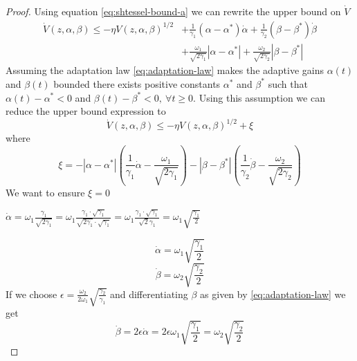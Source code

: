 \begin{proof}
        Using equation \eqref{eq:shtessel-bound-a} we can rewrite the upper bound on $\dot{V}$  
        \begin{equation}
          \begin{split}
            \dot{V}(z, \alpha, \beta) \leq -\eta V(z,\alpha,\beta)^{1/2} &+ \frac{1}{\gamma_1}\left(\alpha - \alpha^*\right)\dot{\alpha} + \frac{1}{\gamma_2} \left(\beta - \beta^*\right)\dot{\beta} \\
            &+ \frac{\omega_1}{\sqrt{2\gamma_1}}\left|\alpha - \alpha^*\right| + \frac{\omega_2}{\sqrt{2\gamma_2}} \left|\beta - \beta^*\right|
          \end{split}
        \end{equation}
        Assuming the adaptation law \eqref{eq:adaptation-law} makes the adaptive gains $\alpha(t)$ and $\beta(t)$ bounded there exists positive constants $\alpha^*$ and $\beta^*$ such that $\alpha(t) - \alpha^* < 0$ and $\beta(t) - \beta^* < 0, \ \forall t \geq 0$.
        Using this assumption we can reduce the upper bound expression to
        \begin{equation}
            \dot{V}(z, \alpha, \beta) \leq -\eta V(z,\alpha,\beta)^{1/2} + \xi
            \label{eq:shtessel-eq-29}
        \end{equation}
        where 
        \begin{equation}
          \xi = -\left|\alpha - \alpha^*\right|\left(\frac{1}{\gamma_1}\dot{\alpha} - \frac{\omega_1}{\sqrt{2\gamma_1}}\right) - \left|\beta - \beta^*\right|\left(\frac{1}{\gamma_2}\dot{\beta} - \frac{\omega_2}{\sqrt{2\gamma_2}}\right) 
        \end{equation}
        We want to ensure $\xi = 0$
        \begin{rmk}
            $\dot{\alpha} = \omega_1\frac{\gamma_1}{\sqrt{2\gamma_1}} = \omega_1\frac{\gamma_1\cdot\sqrt{\gamma_1}}{\sqrt{2\gamma_1}\cdot\sqrt{\gamma_1}}
            = \omega_1\frac{\gamma_1\cdot\sqrt{\gamma_1}}{\sqrt{2}\gamma_1}
            = \omega_1\sqrt{\frac{\gamma_1}{2}} $ 
        \end{rmk}
        \begin{equation}
          \dot{\alpha} = \omega_1 \sqrt{\frac{\gamma_1}{2}}
          \label{eq:shtessel-alpha-dot}
        \end{equation}
        \begin{equation}
          \dot{\beta} = \omega_2 \sqrt{\frac{\gamma_2}{2}}
        \end{equation}
        If we choose $\epsilon = \frac{\omega_2}{2\omega_1} \sqrt{\frac{\gamma_2}{\gamma_1}}$ and differentiating $\beta$ as given by \eqref{eq:adaptation-law} we get 
        \begin{equation}
          \dot{\beta} = 2\epsilon\dot{\alpha} = 2\epsilon\omega_1 \sqrt{\frac{\gamma_1}{2}} = \omega_2 \sqrt{\frac{\gamma_2}{2}}
        \end{equation}


\end{proof}
